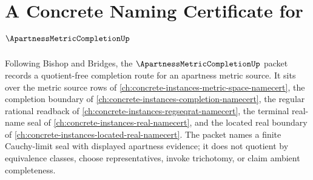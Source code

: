 \chapter{A Concrete Naming Certificate for $\ApartnessMetricCompletionUp$}
\label{ch:concrete-instances-apartness-metric-completion-namecert}

Following Bishop and Bridges, the $\ApartnessMetricCompletionUp$ packet records a quotient-free completion route for an apartness metric source. It sits over the metric source rows of \autoref{ch:concrete-instances-metric-space-namecert}, the completion boundary of \autoref{ch:concrete-instances-completion-namecert}, the regular rational readback of \autoref{ch:concrete-instances-regseqrat-namecert}, the terminal real-name seal of \autoref{ch:concrete-instances-real-namecert}, and the located real boundary of \autoref{ch:concrete-instances-located-real-namecert}. The packet names a finite Cauchy-limit seal with displayed apartness evidence; it does not quotient by equivalence classes, choose representatives, invoke trichotomy, or claim ambient completeness.

